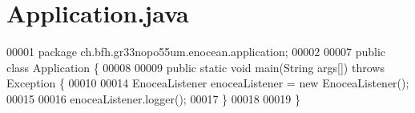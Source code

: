 \section{Application.\+java}
\label{Application_8java_source}

\begin{DoxyCode}
00001 \textcolor{keyword}{package }ch.bfh.gr33nopo55um.enocean.application;
00002 
00007 \textcolor{keyword}{public} \textcolor{keyword}{class }Application \{
00008 
00009     \textcolor{keyword}{public} \textcolor{keyword}{static} \textcolor{keywordtype}{void} main(String args[]) \textcolor{keywordflow}{throws} Exception \{
00010 
00014         EnoceaListener enoceaListener = \textcolor{keyword}{new} EnoceaListener();
00015 
00016         enoceaListener.logger();
00017     \}
00018 
00019 \}
\end{DoxyCode}
